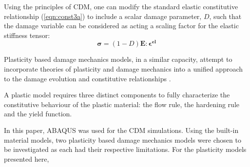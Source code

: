 Using the principles of CDM, one can modify the standard elastic constitutive relationship (\ref{eqn:const3a}) to include a scalar damage parameter, $D$, such that the damage variable can be considered as acting a scaling factor for the elastic stiffness tensor: 
\begin{equation}
\boldsymbol{\sigma}=(1-D)\mathbf{E}:\boldsymbol{\epsilon^{el}}\label{eqn:const3}
\end{equation}




Plasticity based damage mechanics models, in a similar capacity, attempt to incorporate theories of plasticity and damage mechanics into a unified approach to the damage evolution and constitutive relationships \cite{zhang_continuum_2010}.

A plastic model requires three distinct components to fully characterize the constitutive behaviour of the plastic material: the flow rule, the hardening rule and the yield function. 

In this paper, ABAQUS was used for the CDM simulations. Using the built-in material models, two plasticity based damage mechanics models were chosen to be investigated as each had their respective limitations. For the plasticity models presented here, 



